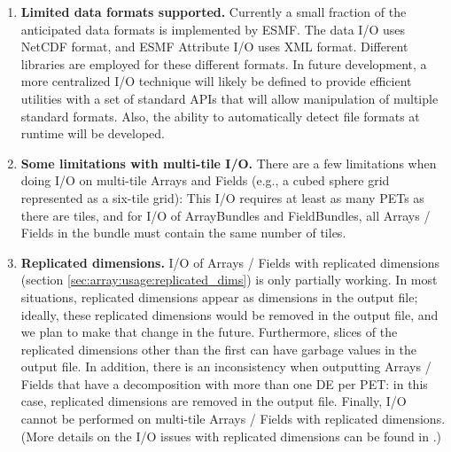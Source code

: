 
\begin{enumerate}

\item {\bf Limited data formats supported.}
Currently a small fraction of the anticipated data formats is implemented by 
ESMF.  The data I/O uses NetCDF format, and ESMF Attribute
I/O uses XML format.  Different libraries are employed for these
different formats.  In future development, a more centralized I/O technique
will likely be defined to provide efficient utilities with a set of standard
APIs that will allow manipulation of multiple standard formats.  Also, the 
ability to automatically detect file formats at runtime will be developed.

\item {\bf Some limitations with multi-tile I/O.}
There are a few limitations when doing I/O on multi-tile Arrays and
Fields (e.g., a cubed sphere grid represented as a six-tile grid): This
I/O requires at least as many PETs as there are tiles, and for I/O of
ArrayBundles and FieldBundles, all Arrays / Fields in the bundle must
contain the same number of tiles.

\item {\bf Replicated dimensions.}
I/O of Arrays / Fields with replicated dimensions (section
\ref{sec:array:usage:replicated_dims}) is only partially working. In
most situations, replicated dimensions appear as dimensions in the
output file; ideally, these replicated dimensions would be removed in
the output file, and we plan to make that change in the future.
Furthermore, slices of the replicated dimensions other than the first
can have garbage values in the output file. In addition, there is an
inconsistency when outputting Arrays / Fields that have a decomposition
with more than one DE per PET: in this case, replicated dimensions are
removed in the output file. Finally, I/O cannot be performed on
multi-tile Arrays / Fields with replicated dimensions. (More details on
the I/O issues with replicated dimensions can be found in
.)

\end{enumerate}
